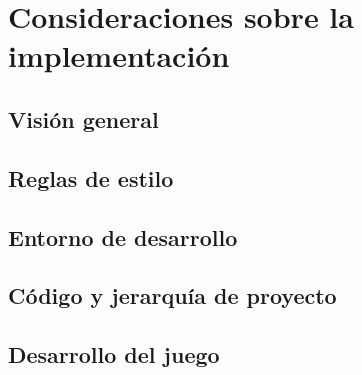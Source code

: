 \chapter{Consideraciones sobre la implementación}

\section{Visión general}

\section{Reglas de estilo}

\section{Entorno de desarrollo}

\section{Código y jerarquía de proyecto}

\section{Desarrollo del juego}